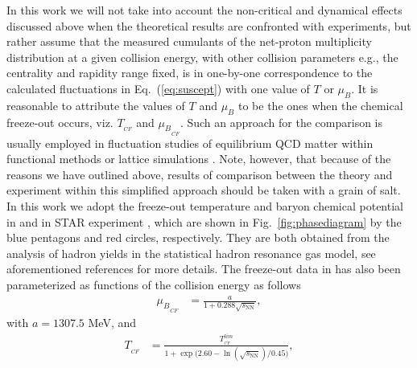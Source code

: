 \documentclass[%
reprint,
superscriptaddress,
showpacs,preprintnumbers,
 amsmath,amssymb,
 aps,
prd,
]{revtex4-1}
\def\Fig#1{Fig.~\ref{#1}} \def\Tab#1{Tab.~\ref{#1}}
\def\Eq#1{Eq.~(\ref{#1})}
\begin{document}
In this work we will not take into account the non-critical and dynamical effects discussed above when the theoretical results are confronted with experiments, but rather assume that the measured cumulants of the net-proton multiplicity distribution at a given collision energy, with other collision parameters e.g., the centrality and rapidity range fixed, is in one-by-one correspondence to the calculated fluctuations in \Eq{eq:suscept} with one value of $T$ or $\mu_B$. It is reasonable to attribute the values of $T$ and $\mu_B$ to be the ones when the chemical freeze-out occurs, viz. $T_{_{CF}}$ and ${\mu_B}_{_{CF}}$. Such an approach for the comparison is usually employed in fluctuation studies of equilibrium QCD matter within functional methods or lattice simulations \cite{Fu:2015amv,Isserstedt:2019pgx,Bazavov:2020bjn}. Note, however, that because of the reasons we have outlined above, results of comparison between the theory and experiment within this simplified approach should be taken with a grain of salt. In this work we adopt the freeze-out temperature and baryon chemical potential in \cite{Andronic:2017pug} and in STAR experiment \cite{Adamczyk:2017iwn}, which are shown in \Fig{fig:phasediagram} by the blue pentagons and red circles, respectively. They are both obtained from the analysis of hadron yields in the statistical hadron resonance gas model, see aforementioned references for more details. The freeze-out data in \cite{Andronic:2017pug} has also been parameterized as functions of the collision energy as follows
%
\begin{align}
   {\mu_B}_{_{CF}}&=\frac{a}{1+0.288\sqrt{s_{\mathrm{NN}}}},\label{eq:muBCFparatri}
\end{align}
%
with $a=1307.5$ MeV, and
%
\begin{align}
   T_{_{CF}}&=\frac{T^{lim}_{_{CF}}}{1+\exp\big(2.60-\ln(\sqrt{s_{\mathrm{NN}}})/0.45\big)},\label{eq:TCFparatri}
\end{align}
%
\end{document}
